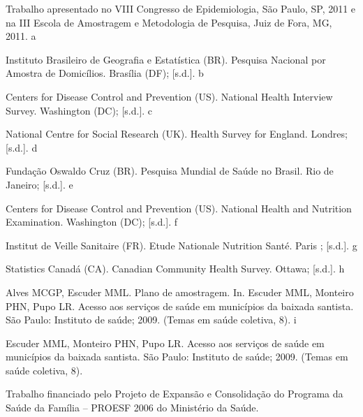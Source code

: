 \documentclass{article}
\begin{document}
Trabalho apresentado no VIII Congresso de Epidemiologia, São Paulo, SP, 2011 e na III Escola de Amostragem e Metodologia de Pesquisa, Juiz de Fora, MG, 2011.
a %

 Instituto Brasileiro de Geografia e Estatística (BR). Pesquisa Nacional por Amostra de Domicílios. Brasília (DF); [s.d.].
b %

 Centers for Disease Control and Prevention (US). National Health Interview Survey. Washington (DC); [s.d.].
c %

 National Centre for Social Research (UK). Health Survey for England. Londres; [s.d.].
d %

 Fundação Oswaldo Cruz (BR). Pesquisa Mundial de Saúde no Brasil. Rio de Janeiro; [s.d.].
e %

 Centers for Disease Control and Prevention (US). National Health and Nutrition Examination. Washington (DC); [s.d.].
f %

 Institut de Veille Sanitaire (FR). Etude Nationale Nutrition Santé. Paris ; [s.d.].
g %

 Statistics Canadá (CA). Canadian Community Health Survey. Ottawa; [s.d.].
h %

 Alves MCGP, Escuder MML. Plano de amostragem. In. Escuder MML, Monteiro PHN, Pupo LR. Acesso aos serviços de saúde em municípios da baixada santista. São Paulo: Instituto de saúde; 2009. (Temas em saúde coletiva, 8).
i %

 Escuder MML, Monteiro PHN, Pupo LR. Acesso aos serviços de saúde em municípios da baixada santista. São Paulo: Instituto de saúde; 2009. (Temas em saúde coletiva, 8).

Trabalho financiado pelo Projeto de Expansão e Consolidação do Programa da Saúde da Família – PROESF 2006 do Ministério da Saúde.
\end{document}
